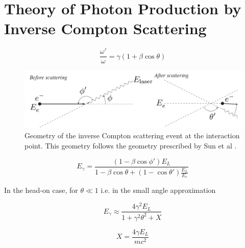 \documentclass[../main.tex]{subfiles}
\begin{document}
\chapter{Theory of Photon Production by Inverse Compton Scattering}
\label{ChapterTemplate} %

\begin{equation}
\frac{\omega'}{\omega} = \gamma\left(1+\beta\cos\theta\right)
\label{eq:doppler_shift}
\end{equation}

\begin{figure}[!htb]
    \centering
    \includegraphics[width=\textwidth]{Figures/scatteringkinematicsdiagram.pdf}
    \caption{Geometry of the inverse Compton scattering event at the interaction point. This geometry follows the geometry prescribed by Sun et al \cite{sun2009energy}. }
    \label{fig:scattered_photon_kinematics}
\end{figure}

\begin{equation}
E_{\gamma} = \frac{\left(1-\beta\cos\phi'\right)E_{L}}{1-\beta\cos\theta+\left(1-\cos\theta'\right)\frac{E_{L}}{E_{e}}} 
\label{eq:scattered_photon_energy}
\end{equation}

In the head-on case, for $\theta \ll 1$ i.e. in the small angle approximation

\begin{equation}
E_{\gamma} \approx \frac{4\gamma^{2}E_{L}}{1+\gamma^{2}\theta^{2}+X}    
\label{eq:small_angle_scattered_photon_energy}
\end{equation}

\begin{equation}
X = \frac{4\gamma E_{L}}{mc^{2}}
\label{eq:recoil_term}
\end{equation}
\end{document}
